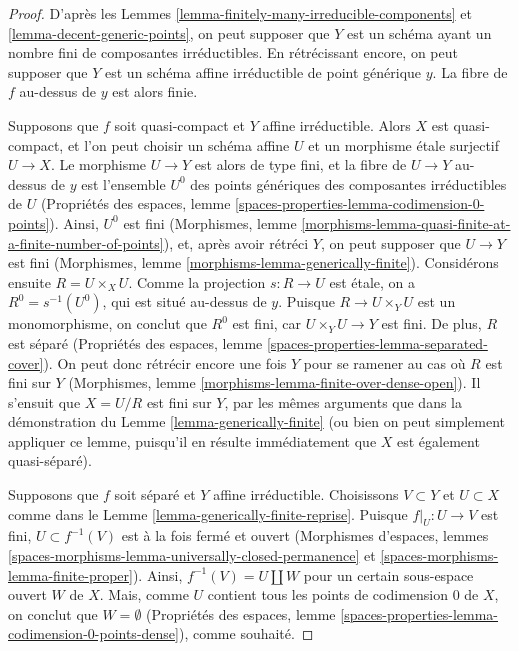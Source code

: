 \begin{proof}
D'après les Lemmes \ref{lemma-finitely-many-irreducible-components} et
\ref{lemma-decent-generic-points}, on peut supposer que $Y$ est un schéma
ayant un nombre fini de composantes irréductibles. En rétrécissant encore,
on peut supposer que $Y$ est un schéma affine irréductible de point générique
$y$. La fibre de $f$ au-dessus de $y$ est alors finie.

\medskip\noindent
Supposons que $f$ soit quasi-compact et $Y$ affine irréductible. Alors $X$
est quasi-compact, et l'on peut choisir un schéma affine $U$ et un morphisme
étale surjectif $U \to X$. Le morphisme $U \to Y$ est alors de type fini,
et la fibre de $U \to Y$ au-dessus de $y$ est l'ensemble $U^0$ des points
génériques des composantes irréductibles de $U$ (Propriétés des espaces,
lemme \ref{spaces-properties-lemma-codimension-0-points}).
Ainsi, $U^0$ est fini
(Morphismes, lemme
\ref{morphisms-lemma-quasi-finite-at-a-finite-number-of-points}),
et, après avoir rétréci $Y$, on peut supposer que $U \to Y$ est fini
(Morphismes, lemme \ref{morphisms-lemma-generically-finite}).
Considérons ensuite $R = U \times_X U$. Comme la projection
$s : R \to U$ est étale, on a $R^0 = s^{-1}(U^0)$, qui est situé au-dessus
de $y$. Puisque $R \to U \times_Y U$ est un monomorphisme, on conclut que
$R^0$ est fini, car $U \times_Y U \to Y$ est fini.
De plus, $R$ est séparé
(Propriétés des espaces, lemme \ref{spaces-properties-lemma-separated-cover}).
On peut donc rétrécir encore une fois $Y$ pour se ramener au cas où $R$ est
fini sur $Y$
(Morphismes, lemme \ref{morphisms-lemma-finite-over-dense-open}).
Il s'ensuit que $X = U/R$ est fini sur $Y$, par les mêmes arguments que dans
la démonstration du Lemme \ref{lemma-generically-finite}
(ou bien on peut simplement appliquer ce lemme, puisqu'il en résulte
immédiatement que $X$ est également quasi-séparé).

\medskip\noindent
Supposons que $f$ soit séparé et $Y$ affine irréductible. Choisissons
$V \subset Y$ et $U \subset X$ comme dans le
Lemme \ref{lemma-generically-finite-reprise}.
Puisque $f|_U : U \to V$ est fini, $U \subset f^{-1}(V)$ est à la fois fermé
et ouvert
(Morphismes d'espaces, lemmes
\ref{spaces-morphisms-lemma-universally-closed-permanence} et
\ref{spaces-morphisms-lemma-finite-proper}).
Ainsi, $f^{-1}(V) = U \amalg W$ pour un certain sous-espace ouvert $W$ de
$X$. Mais, comme $U$ contient tous les points de codimension $0$ de $X$,
on conclut que $W = \emptyset$
(Propriétés des espaces, lemme
\ref{spaces-properties-lemma-codimension-0-points-dense}),
comme souhaité.
\end{proof}






